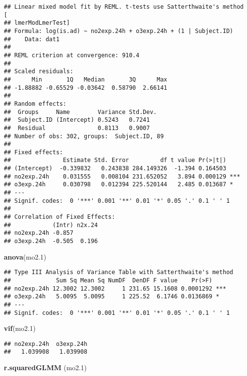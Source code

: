 \documentclass[12pt,]{article}
\newenvironment{Shaded}{\begin{snugshade}}{\end{snugshade}}
\newcommand{\FloatTok}[1]{\textcolor[rgb]{0.00,0.00,0.81}{#1}}
\newcommand{\KeywordTok}[1]{\textcolor[rgb]{0.13,0.29,0.53}{\textbf{#1}}}
\newcommand{\NormalTok}[1]{#1}
\begin{document}
\begin{verbatim}
## Linear mixed model fit by REML. t-tests use Satterthwaite's method [
## lmerModLmerTest]
## Formula: log(is.ad) ~ no2exp.24h + o3exp.24h + (1 | Subject.ID)
##    Data: dat1
## 
## REML criterion at convergence: 910.4
## 
## Scaled residuals: 
##      Min       1Q   Median       3Q      Max 
## -1.88882 -0.65529 -0.03642  0.58790  2.66141 
## 
## Random effects:
##  Groups     Name        Variance Std.Dev.
##  Subject.ID (Intercept) 0.5243   0.7241  
##  Residual               0.8113   0.9007  
## Number of obs: 302, groups:  Subject.ID, 89
## 
## Fixed effects:
##               Estimate Std. Error         df t value Pr(>|t|)    
## (Intercept)  -0.339832   0.243838 284.149326  -1.394 0.164503    
## no2exp.24h    0.031555   0.008104 231.652052   3.894 0.000129 ***
## o3exp.24h     0.030798   0.012394 225.520144   2.485 0.013687 *  
## ---
## Signif. codes:  0 '***' 0.001 '**' 0.01 '*' 0.05 '.' 0.1 ' ' 1
## 
## Correlation of Fixed Effects:
##            (Intr) n2x.24
## no2exp.24h -0.857       
## o3exp.24h  -0.505  0.196
\end{verbatim}

\begin{Shaded}
\begin{Highlighting}[]
\KeywordTok{anova}\NormalTok{(mo2}\FloatTok{.1}\NormalTok{)}
\end{Highlighting}
\end{Shaded}

\begin{verbatim}
## Type III Analysis of Variance Table with Satterthwaite's method
##             Sum Sq Mean Sq NumDF  DenDF F value    Pr(>F)    
## no2exp.24h 12.3002 12.3002     1 231.65 15.1608 0.0001292 ***
## o3exp.24h   5.0095  5.0095     1 225.52  6.1746 0.0136869 *  
## ---
## Signif. codes:  0 '***' 0.001 '**' 0.01 '*' 0.05 '.' 0.1 ' ' 1
\end{verbatim}

\begin{Shaded}
\begin{Highlighting}[]
\KeywordTok{vif}\NormalTok{(mo2}\FloatTok{.1}\NormalTok{)}
\end{Highlighting}
\end{Shaded}

\begin{verbatim}
## no2exp.24h  o3exp.24h 
##   1.039908   1.039908
\end{verbatim}

\begin{Shaded}
\begin{Highlighting}[]
\KeywordTok{r.squaredGLMM}\NormalTok{ (mo2}\FloatTok{.1}\NormalTok{)}
\end{Highlighting}
\end{Shaded}
\end{document}
